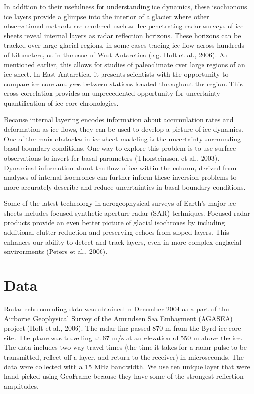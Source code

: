 \documentclass[draft,jgrga]{agutex}
\begin{document}
	In addition to their usefulness for understanding ice dynamics, these isochronous ice layers provide a glimpse into the interior of a glacier where other observational methods are rendered useless. Ice-penetrating radar surveys of ice sheets reveal internal layers as radar reflection horizons. These horizons can be tracked over large glacial regions, in some cases tracing ice flow across hundreds of kilometers, as in the case of West Antarctica (e.g. Holt et al., 2006). As mentioned earlier, this allows for studies of paleoclimate over large regions of an ice sheet. In East Antarctica, it presents scientists with the opportunity to compare ice core analyses between stations located throughout the region. This cross-correlation provides an unprecedented opportunity for uncertainty quantification of ice core chronologies. 

Because internal layering encodes information about accumulation rates and deformation as ice flows, they can be used to develop a picture of ice dynamics. One of the main obstacles in ice sheet modeling is the uncertainty surrounding basal boundary conditions. One way to explore this problem is to use surface observations to invert for basal parameters (Thorsteinsson et al., 2003). Dynamical information about the flow of ice within the column, derived from analyses of internal isochrones can further inform these inversion problems to more accurately describe and reduce uncertainties in basal boundary conditions. 

Some of the latest technology in aerogeophysical surveys of Earth’s major ice sheets includes focused synthetic aperture radar (SAR) techniques. Focused radar products provide an even better picture of glacial isochrones by including additional clutter reduction and preserving echoes from sloped layers. This enhances our ability to detect and track layers, even in more complex englacial environments (Peters et al., 2006). 


\section{Data}

Radar-echo sounding data was obtained in December 2004 as a part of the Airborne Geophysical Survey of the Amundsen Sea Embayment (AGASEA) project (Holt et al., 2006). The radar line passed 870 m from the Byrd ice core site. The plane was travelling at 67 m/s at an elevation of 550 m above the ice. The data includes two-way travel times (the time it takes for a radar pulse to be transmitted, reflect off a layer, and return to the receiver) in microseconds. The data were collected with a 15 MHz bandwidth. We use ten unique layer that were hand picked using GeoFrame because they have some of the strongest reflection amplitudes.
\end{document}
